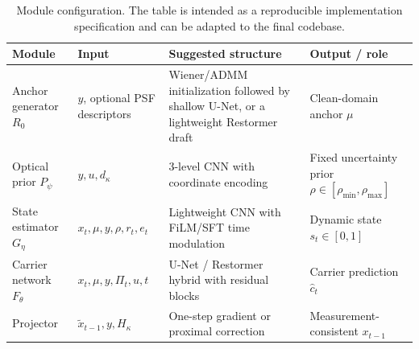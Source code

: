\documentclass[journal]{IEEEtran}
\newcommand{\hk}{H_{\kappa}}
\begin{document}
\begin{table}[t]
\centering
\caption{Module configuration. The table is intended as a reproducible implementation specification and can be adapted to the final codebase.}
\label{tab:modules}
\begin{tabular}{p{}p{}p{}p{}}
\toprule
Module & Input & Suggested structure & Output / role \\
\midrule
Anchor generator $R_0$ & $y$, optional PSF descriptors & Wiener/ADMM initialization followed by shallow U-Net, or a lightweight Restormer draft & Clean-domain anchor $\mu$ \\
Optical prior $P_\psi$ & $y,u,d_\kappa$ & 3-level CNN with coordinate encoding & Fixed uncertainty prior $\rho\in[\rho_{\min},\rho_{\max}]$ \\
State estimator $G_\eta$ & $x_t,\mu,y,\rho,r_t,e_t$ & Lightweight CNN with FiLM/SFT time modulation & Dynamic state $s_t\in[0,1]$ \\
Carrier network $F_\theta$ & $x_t,\mu,y,\Pi_t,u,t$ & U-Net / Restormer hybrid with residual blocks & Carrier prediction $\hat c_t$ \\
Projector & $\tilde x_{t-1},y,\hk$ & One-step gradient or proximal correction & Measurement-consistent $x_{t-1}$ \\
\bottomrule
\end{tabular}
\end{table}
\end{document}
